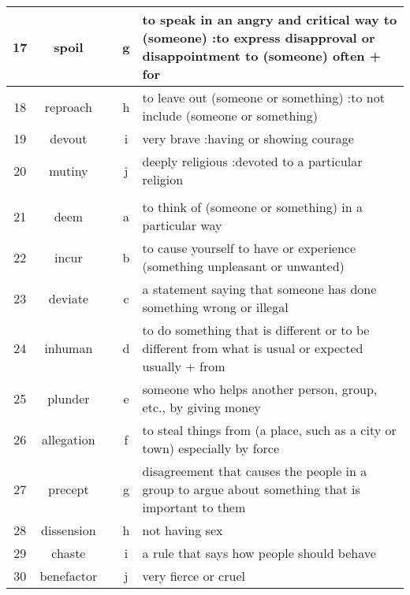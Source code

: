 \documentclass[a4paper]{article}
\begin{document}
\begin{center}
\begin{tabular}{|c|c|c|c|m{}|}
\hline
 17 & spoil & & g &  to speak in an angry and critical way to (someone) :to express disapproval or disappointment to (someone) often + for \\
\hline
 18 & reproach & & h &  to leave out (someone or something) :to not include (someone or something) \\
\hline
 19 & devout & & i &  very brave :having or showing courage \\
\hline
 20 & mutiny & & j &  deeply religious :devoted to a particular religion \\
\hline
 & & & & \\
\hline
 21 & deem & & a &  to think of (someone or something) in a particular way \\
\hline
 22 & incur & & b &  to cause yourself to have or experience (something unpleasant or unwanted) \\
\hline
 23 & deviate & & c &  a statement saying that someone has done something wrong or illegal \\
\hline
 24 & inhuman & & d &  to do something that is different or to be different from what is usual or expected usually + from \\
\hline
 25 & plunder & & e &  someone who helps another person, group, etc., by giving money \\
\hline
 26 & allegation & & f &  to steal things from (a place, such as a city or town) especially by force \\
\hline
 27 & precept & & g &  disagreement that causes the people in a group to argue about something that is important to them \\
\hline
 28 & dissension & & h &  not having sex \\
\hline
 29 & chaste & & i &  a rule that says how people should behave \\
\hline
 30 & benefactor & & j &  very fierce or cruel \\
\hline
\end{tabular}
\end{center}
\end{document}
